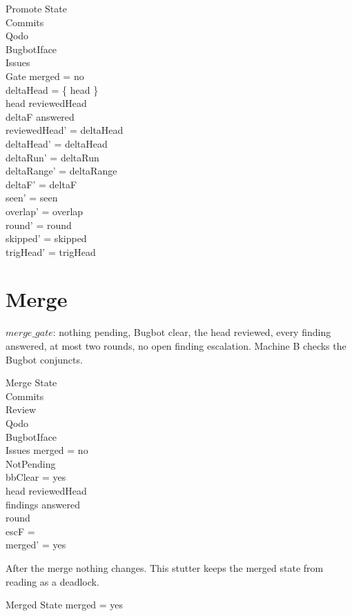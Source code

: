 \documentclass{article}
\begin{document}
\begin{schema}{Promote}
  \Delta State \\
  \Xi Commits \\
  \Xi Qodo \\
  \Xi BugbotIface \\
  \Xi Issues \\
  \Xi Gate
\where
  merged = no \\
  deltaHead = \{ head \} \\
  head \notin reviewedHead \\
  deltaF \subseteq answered \\
  reviewedHead' = deltaHead \\
  deltaHead' = deltaHead \\
  deltaRun' = deltaRun \\
  deltaRange' = deltaRange \\
  deltaF' = deltaF \\
  seen' = seen \\
  overlap' = overlap \\
  round' = round \\
  skipped' = skipped \\
  trigHead' = trigHead
\end{schema}

\section{Merge}

$merge\_gate$: nothing pending, Bugbot clear, the head reviewed, every finding
answered, at most two rounds, no open finding escalation. Machine B checks the
Bugbot conjuncts.

\begin{schema}{Merge}
  \Delta State \\
  \Xi Commits \\
  \Xi Review \\
  \Xi Qodo \\
  \Xi BugbotIface \\
  \Xi Issues
\where
  merged = no \\
  NotPending \\
  bbClear = yes \\
  head \in reviewedHead \\
  findings \subseteq answered \\
  round  \\
  escF = \emptyset \\
  merged' = yes
\end{schema}

After the merge nothing changes. This stutter keeps the merged state from
reading as a deadlock.

\begin{schema}{Merged}
  \Xi State
\where
  merged = yes
\end{schema}
\end{document}
